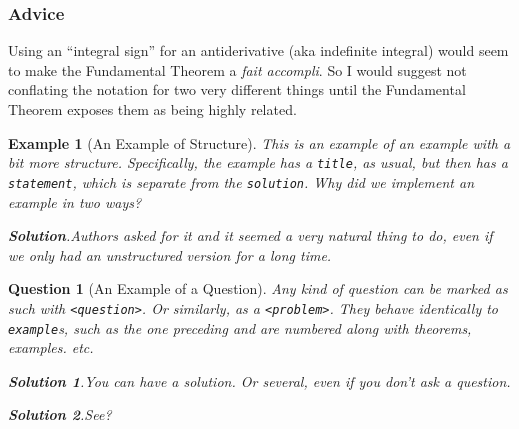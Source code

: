 \documentclass[pdflatex]{sn-jnl}
\theoremstyle{thmstyleone}%
\theoremstyle{thmstyletwo}%
\newtheorem{question}[theorem]{Question}
\newtheorem{example}[theorem]{Example}
\theoremstyle{thmstylethree}%
\newcommand{\blocktitlefont}{\relax}
\newcommand{\mono}[1]{\texttt{#1}}
\numberwithin{equation}{section}
\begin{document}
\subsubsection{Advice}\label{section-interesting-corollary-5-3}%
Using an ``integral sign'' for an antiderivative (aka indefinite integral) would seem to make the Fundamental Theorem a \textit{fait accompli}.  So I would suggest not conflating the notation for two very different things until the Fundamental Theorem exposes them as being highly related.%
\begin{example}[An Example of Structure]\label{example-structured}%
%
This is an example of an example with a bit more structure.  Specifically, the example has a \mono{title}, as usual, but then has a \mono{statement}, which is separate from the \mono{solution}.  Why did we implement an example in two ways?%
\par\smallskip%
\noindent\textbf{\blocktitlefont Solution}.\hypertarget{example-structured-3}{}\quad{}Authors asked for it and it seemed a very natural thing to do, even if we only had an unstructured version for a long time.%
\end{example}
\begin{question}[An Example of a Question]\label{sample-question}%
%
Any kind of question can be marked as such with \mono{<question>}.  Or similarly, as a \mono{<problem>}.  They behave identically to \mono{example}s, such as the one preceding and are numbered along with theorems, examples. etc.%
\par\smallskip%
\noindent\textbf{\blocktitlefont Solution 1}.\hypertarget{sample-question-3}{}\quad{}You can have a solution. Or several, even if you don't ask a question.%
\par\smallskip%
\noindent\textbf{\blocktitlefont Solution 2}.\hypertarget{sample-question-4}{}\quad{}See?%
\end{question}
\end{document}
